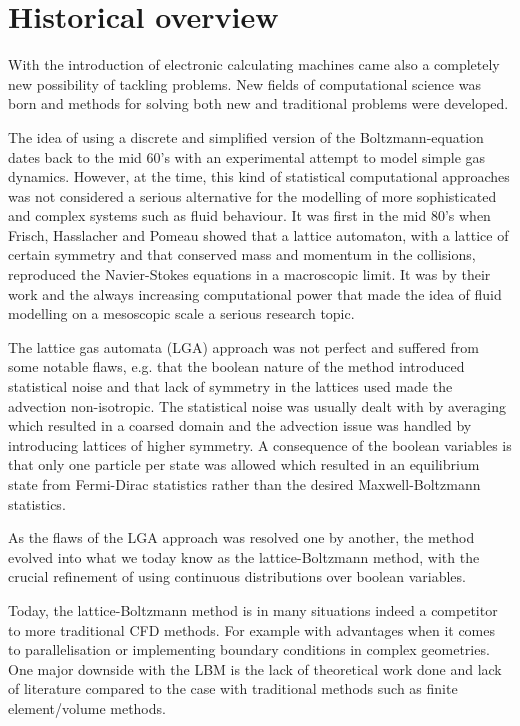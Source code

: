 \section{Historical overview}
With the introduction of electronic calculating machines came also a
completely new possibility of tackling problems. New fields of
computational science was born and methods for solving both new and
traditional problems were developed.

The idea of using a discrete and simplified version of the
Boltzmann-equation dates back to the mid 60's \cite{scholarpedia-lbm}
with an experimental attempt to model simple gas dynamics. However, at
the time, this kind of statistical computational approaches was not
considered a serious alternative for the modelling of more
sophisticated and complex systems such as fluid behaviour. It was
first in the mid 80's when Frisch, Hasslacher and Pomeau showed that a
lattice automaton, with a lattice of certain symmetry and that
conserved mass and momentum in the collisions, reproduced the
Navier-Stokes equations in a macroscopic limit. It was by their work
and the always increasing computational power that made the idea of
fluid modelling on a mesoscopic scale a serious research
topic. \cite{wolf-gladrow}

The lattice gas automata (LGA) approach was not perfect and suffered
from some notable flaws, e.g. that the boolean nature of the method
introduced statistical noise and that lack of symmetry in the lattices
used made the advection non-isotropic. The statistical noise was
usually dealt with by averaging which resulted in a coarsed domain and
the advection issue was handled by introducing lattices of higher
symmetry. A consequence of the boolean variables is that only one
particle per state was allowed which resulted in an equilibrium state
from Fermi-Dirac statistics rather than the desired Maxwell-Boltzmann
statistics. 

As the flaws of the LGA approach was resolved one by
another, the method evolved into what we today know as the
lattice-Boltzmann method, with the crucial refinement of using
continuous distributions over boolean variables. \cite{wolf-gladrow}

Today, the lattice-Boltzmann method is in many situations indeed a
competitor to more traditional CFD methods. For example with
advantages when it comes to parallelisation or implementing boundary
conditions in complex geometries. One major downside with the LBM is
the lack of theoretical work done and lack of literature compared to
the case with traditional methods such as finite element/volume
methods. \cite{junk-asym}
